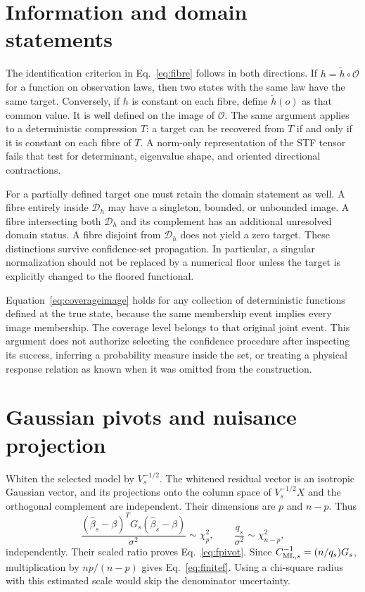 \section{Information and domain statements}
\label{app:fibres}

The identification criterion in Eq.~\eqref{eq:fibre} follows in both directions. If $h=\widetilde h\circ\mathcal O$ for a function on observation laws, then two states with the same law have the same target. Conversely, if $h$ is constant on each fibre, define $\widetilde h(o)$ as that common value. It is well defined on the image of $\mathcal O$. The same argument applies to a deterministic compression $T$: a target can be recovered from $T$ if and only if it is constant on each fibre of $T$. A norm-only representation of the STF tensor fails that test for determinant, eigenvalue shape, and oriented directional contractions.

For a partially defined target one must retain the domain statement as well. A fibre entirely inside $\mathcal D_h$ may have a singleton, bounded, or unbounded image. A fibre intersecting both $\mathcal D_h$ and its complement has an additional unresolved domain status. A fibre disjoint from $\mathcal D_h$ does not yield a zero target. These distinctions survive confidence-set propagation. In particular, a singular normalization should not be replaced by a numerical floor unless the target is explicitly changed to the floored functional.

Equation~\eqref{eq:coverageimage} holds for any collection of deterministic functions defined at the true state, because the same membership event implies every image membership. The coverage level belongs to that original joint event. This argument does not authorize selecting the confidence procedure after inspecting its success, inferring a probability measure inside the set, or treating a physical response relation as known when it was omitted from the construction.

\section{Gaussian pivots and nuisance projection}
\label{app:pivot}

Whiten the selected model by $V_s^{-1/2}$. The whitened residual vector is an isotropic Gaussian vector, and its projections onto the column space of $V_s^{-1/2}X$ and the orthogonal complement are independent. Their dimensions are $p$ and $n-p$. Thus
\begin{equation}
 \frac{(\widehat\beta_s-\beta)^TG_s(\widehat\beta_s-\beta)}{\sigma^2}
 \sim\chi^2_p,\qquad \frac{q_s}{\sigma^2}\sim\chi^2_{n-p},
\end{equation}
independently. Their scaled ratio proves Eq.~\eqref{eq:fpivot}. Since $C_{{\rm ML},s}^{-1}=(n/q_s)G_s$, multiplication by $np/(n-p)$ gives Eq.~\eqref{eq:finitef}. Using a chi-square radius with this estimated scale would skip the denominator uncertainty.

